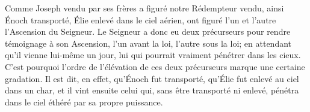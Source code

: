 Comme Joseph vendu par ses frères a figuré notre Rédempteur vendu,
	ainsi Énoch transporté, Élie enlevé dans le ciel aérien,
	ont figuré l’un et l’autre l’Ascension du Seigneur.
Le Seigneur a donc eu deux précurseurs pour rendre témoignage à son Ascension,
	l’un avant la loi, l’autre sous la loi;
	en attendant qu’il vienne lui-même un jour,
	lui qui pourrait vraiment pénétrer dans les cieux.
C’est pourquoi l’ordre de l’élévation de ces deux précurseurs
	marque une certaine gradation.
Il est dit, en effet, qu’Énoch fut transporté,
	qu’Élie fut enlevé au ciel dans un char,
	et il vint ensuite celui qui, sans être transporté ni enlevé,
	pénétra dans le ciel éthéré par sa propre puissance.
